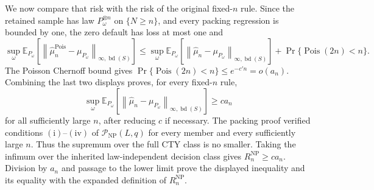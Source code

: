 We now compare that risk with the risk of the original fixed-\(n\) rule.  Since the retained sample has law \(P_\omega^{\otimes n}\) on \(\{N\geq n\}\), and every packing regression is bounded by one, the zero default has loss at most one and
\[
 \sup_\omega \mathbb E_{P_\omega}
 \left[\left\|\widehat\mu_n^{\mathrm{Pois}}-\mu_{P_\omega}\right\|_{\infty,\operatorname{bd}(S)}\right]
 \leq
 \sup_\omega \mathbb E_{P_\omega}
 \left[\left\|\widehat\mu_n-\mu_{P_\omega}\right\|_{\infty,\operatorname{bd}(S)}\right]
 +\Pr\{\operatorname{Pois}(2n)<n\}.
\]
The Poisson Chernoff bound gives \(\Pr\{\operatorname{Pois}(2n)<n\}\leq e^{-c'n}=o(a_n)\).  Combining the last two displays proves, for every fixed-\(n\) rule,
\[
 \sup_\omega \mathbb E_{P_\omega}
 \left[\left\|\widehat\mu_n-\mu_{P_\omega}\right\|_{\infty,\operatorname{bd}(S)}\right]
 \geq c a_n
\]
for all sufficiently large \(n\), after reducing \(c\) if necessary.  The packing proof verified conditions \(\mathrm{(i)}\)--\(\mathrm{(iv)}\) of \(\mathcal P_{\mathrm{NP}}(L,q)\) for every member and every sufficiently large \(n\).  Thus the supremum over the full CTY class is no smaller.  Taking the infimum over the inherited law-independent decision class gives \(R_n^{\mathrm{NP}}\geq ca_n\).  Division by \(a_n\) and passage to the lower limit prove the displayed inequality and its equality with the expanded definition of \(R_n^{\mathrm{NP}}\).